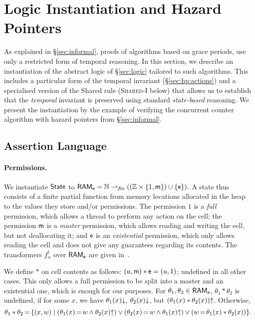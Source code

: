
\section{Logic Instantiation and Hazard Pointers}\label{sec:grace}

As explained in \S\ref{sec:informal}, proofs of algorithms based on grace
periods, use only a restricted form of temporal reasoning. In this section, we
describe an instantiation of the abstract logic of \S\ref{sec:logic} tailored to
such algorithms. 
This includes a particular form of the temporal invariant
(\S\ref{sec:hp:actions}) and a specialised version of the {\sc Shared} rule
(\textsc{Shared-I} below) that allows us to establish that the {\em temporal}
invariant is preserved using standard {\em state-based} reasoning.
We present the instantiation by the example of verifying the concurrent counter
algorithm with hazard pointers from \S\ref{sec:informal}.

\subsection{Assertion Language \label{sec:perm}}

\paragraph{Permissions.} We instantiate ${\sf State}$ to
\mbox{$
{\sf RAM}_{\sf e}
= \mathbb{N} \rightharpoonup_{\it fin} ((\mathbb{Z} \times \{1, {\sf m}\}) \cup \{{\sf e} \}).
$}
A state thus consists of a finite partial function from
memory locations allocated in the heap to the values they store and/or permissions.
The permission $1$ is a
\emph{full} permission, which allows a thread to perform any action on
the cell; the permission ${\sf m}$ is a \emph{master} permission, which allows
reading and writing the cell, but not deallocating it; and ${\sf e}$ is an {\em
  existential} permission, which only allows reading the cell and does not give
any guarantees regarding its contents. The transformers $f_\alpha^t$ 
over ${\sf RAM}_{{\sf e}}$ are given in~\tr{\ref{app:formal}}{\nformal}.


We define $*$ on cell contents as follows: $(u, {\sf m}) * {\sf e} = (u, 1)$; undefined
in all other cases. This only allows a full permission to be split into a master
and an existential one, which is enough for our purposes.  For $\theta_1,
\theta_2 \in {\sf RAM}_{\sf e}$, $\theta_1*\theta_2$ is undefined, if for some $x$,
we have $\theta_1(x)\mathpunct{\downarrow}$, $\theta_2(x)\mathpunct{\downarrow}$, but
$(\theta_1(x)*\theta_2(x))\mathpunct{\uparrow}$. Otherwise,
$$
\theta_1*\theta_2 \,{=}\, \{(x, w) \mid
(\theta_1(x) \,{=}\, w \wedge {\theta_2(x)\mathpunct{\uparrow}})
\vee
(\theta_2(x) \,{=}\, w \wedge {\theta_1(x)\mathpunct{\uparrow}})
\vee (w \,{=}\, \theta_1(x) * \theta_2(x))\}.
$$

